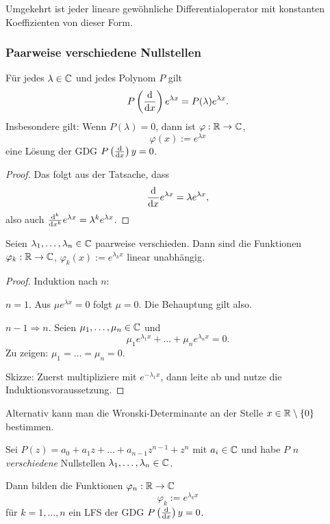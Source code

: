 Umgekehrt ist jeder lineare gewöhnliche Differentialoperator mit konstanten
Koeffizienten von dieser Form.

\clearpage

\subsubsection{Paarweise verschiedene Nullstellen}
\begin{lem}
  Für jedes $\lambda \in \mathbb{C}$ und jedes Polynom $P$ gilt
  \[ P\left( \frac{\mathrm{d} }{\mathrm{d} x} \right) e^{\lambda x} = P(\lambda) e^{\lambda x}. \]
  Insbesondere gilt: Wenn $P(\lambda) = 0$, dann ist $\varphi:\mathbb{R} \to
  \mathbb{C}$,
  \[ \varphi(x) := e^{\lambda x} \]
  eine Lösung der GDG $P\left( \frac{\mathrm{d} }{\mathrm{d} x} \right) y = 0$.
\end{lem}

\begin{proof}
  Das folgt aus der Tatsache, dass
  \[ \frac{\mathrm{d} }{\mathrm{d} x} e^{\lambda x} = \lambda e^{\lambda x}, \]
  also auch $\frac{\mathrm{d}^k}{\mathrm{d} x^k} e^{\lambda x} = \lambda^k e^{\lambda
    x}$. 
\end{proof}

\begin{prp}
  Seien $\lambda_1, \ldots, \lambda_n \in \mathbb{C}$ paarweise verschieden. Dann
  sind die Funktionen $\varphi_k : \mathbb{R} \to \mathbb{C}$, $\varphi_k(x) :=
  e^{\lambda_k x}$ linear unabhängig.
\end{prp}

\begin{proof}
  Induktion nach $n$:

  $n=1$. Aus $\mu e^{\lambda x} = 0$ folgt $\mu = 0$. Die Behauptung gilt also.

  $n-1 \Rightarrow n$. Seien $\mu_1, \ldots, \mu_n \in \mathbb{C}$ und
  \[ \mu_1 e^{\lambda_1 x} + \ldots + \mu_n e^{\lambda_n x} = 0. \]
  Zu zeigen: $\mu_1 = \ldots = \mu_n = 0$.
  
  Skizze: Zuerst multipliziere mit $e^{-\lambda_1 x}$, dann leite ab und nutze
  die Induktionsvoraussetzung.
\end{proof}

Alternativ kann man die Wronski-Determinante an der Stelle $x \in \mathbb{R}
\setminus \{ 0 \}$ bestimmen.

\begin{thm}
  Sei $P(z) = a_0 + a_1 z + \ldots + a_{n-1} z^{n-1} + z^n$ mit $a_i \in
  \mathbb{C}$ und habe $P$ $n$ \emph{verschiedene} Nullstellen $\lambda_1, \ldots,
  \lambda_n \in \mathbb{C}$.

  Dann bilden die Funktionen $\varphi_n: \mathbb{R}  \to \mathbb{C}$
  \[ \varphi_k := e^{\lambda_k x} \]
  für $k = 1, \ldots, n$ ein LFS der GDG $P\left( \frac{\mathrm{d} }{\mathrm{d} x} \right) y = 0$.
\end{thm}

